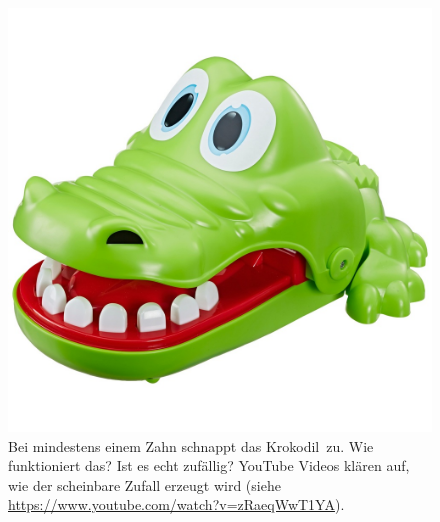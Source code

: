 \begin{figure}[H]
\centering
\includegraphics[scale=0.1]{croco_doc.jpg}
\caption{Bei mindestens einem Zahn schnappt das Krokodil\protect\footnotemark~zu. Wie funktioniert das? Ist es echt zufällig? YouTube Videos klären auf, wie der scheinbare Zufall erzeugt wird (siehe \protect\url{https://www.youtube.com/watch?v=zRaeqWwT1YA}).}
\end{figure}

